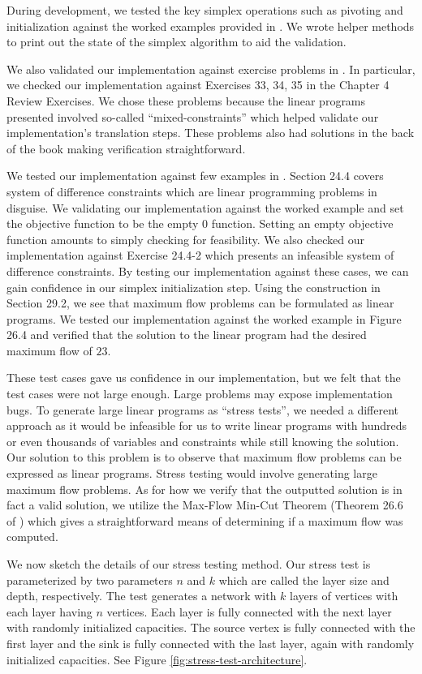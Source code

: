 \documentclass{article}
\begin{document}
During development, we tested the key simplex operations such as pivoting and initialization against the worked examples provided in \cite{CLRS}. We wrote helper methods to print out the state of the simplex algorithm to aid the validation. 

We also validated our implementation against exercise problems in \cite{finitebook}. In particular, we checked our implementation against Exercises 33, 34, 35 in the Chapter 4 Review Exercises. We chose these problems because the linear programs presented involved so-called ``mixed-constraints'' which helped validate our implementation's translation steps. These problems also had solutions in the back of the book making verification straightforward. 

We tested our implementation against few examples in \cite{CLRS}. Section 24.4 covers system of difference constraints which are linear programming problems in disguise. We validating our implementation against the worked example and set the objective function to be the empty $0$ function. Setting an empty objective function amounts to simply checking for feasibility. We also checked our implementation against Exercise 24.4-2 which presents an infeasible system of difference constraints. By testing our implementation against these cases, we can gain confidence in our simplex initialization step. Using the construction in Section 29.2, we see that maximum flow problems can be formulated as linear programs. We tested our implementation against the worked example in Figure 26.4 and verified that the solution to the linear program had the desired maximum flow of $23$. 

These test cases gave us confidence in our implementation, but we felt that the test cases were not large enough. Large problems may expose implementation bugs. To generate large linear programs as ``stress tests'', we needed a different approach as it would be infeasible for us to write linear programs with hundreds or even thousands of variables and constraints while still knowing the solution. Our solution to this problem is to observe that maximum flow problems can be expressed as linear programs. Stress testing would involve generating large maximum flow problems. As for how we verify that the outputted solution is in fact a valid solution, we utilize the Max-Flow Min-Cut Theorem (Theorem 26.6 of \cite{CLRS}) which gives a straightforward means of determining if a maximum flow was computed.

We now sketch the details of our stress testing method. Our stress test is parameterized by two parameters $n$ and $k$ which are called the layer size and depth, respectively. The test generates a network with $k$ layers of vertices with each layer having $n$ vertices. Each layer is fully connected with the next layer with randomly initialized capacities. The source vertex is fully connected with the first layer and the sink is fully connected with the last layer, again with randomly initialized capacities. See Figure \ref{fig:stress-test-architecture}.
\end{document}
